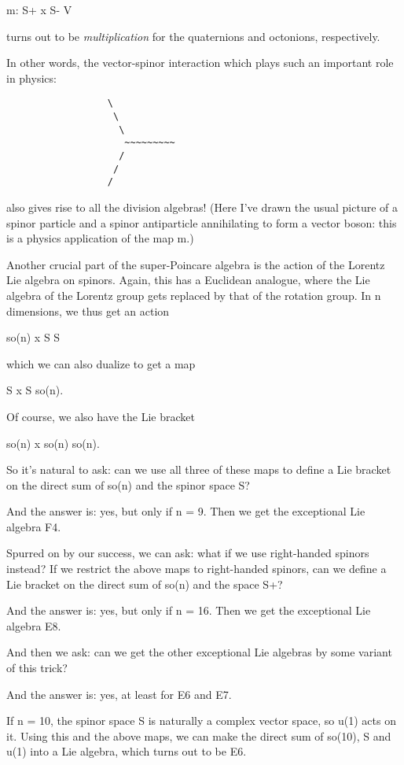 m: S+ x S- \to  V

turns out to be \emph{multiplication} for the quaternions and octonions, 
respectively.  

In other words, the vector-spinor interaction which plays such an
important role in physics:

\begin{verbatim}
                  \
                   \
                    \
                     ~~~~~~~~~
                    /
                   /
                  /

\end{verbatim}
    
also gives rise to all the division algebras!  (Here I've drawn the
usual picture of a spinor particle and a spinor antiparticle annihilating 
to form a vector boson: this is a physics application of the map m.)

Another crucial part of the super-Poincare algebra is the action of the 
Lorentz Lie algebra on spinors.  Again, this has a Euclidean analogue,
where the Lie algebra of the Lorentz group gets replaced by that of 
the rotation group.  In n dimensions, we thus get an action

so(n) x S \to  S

which we can also dualize to get a map

S x S \to  so(n).

Of course, we also have the Lie bracket

so(n) x so(n) \to  so(n).

So it's natural to ask: can we use all three of these maps to define
a Lie bracket on the direct sum of so(n) and the spinor space S?

And the answer is: yes, but only if n = 9.  Then we get the exceptional
Lie algebra F4.  

Spurred on by our success, we can ask: what if we use right-handed
spinors instead?  If we restrict the above maps to right-handed spinors,
can we define a Lie bracket on the direct sum of so(n) and the space S+?

And the answer is: yes, but only if n = 16.  Then we get the exceptional
Lie algebra E8.

And then we ask: can we get the other exceptional Lie algebras by some
variant of this trick?  

And the answer is: yes, at least for E6 and E7.  

If n = 10, the spinor space S is naturally a complex vector space, so
u(1) acts on it.  Using this and the above maps, we can make the direct
sum of so(10), S and u(1) into a Lie algebra, which turns out to be E6.

